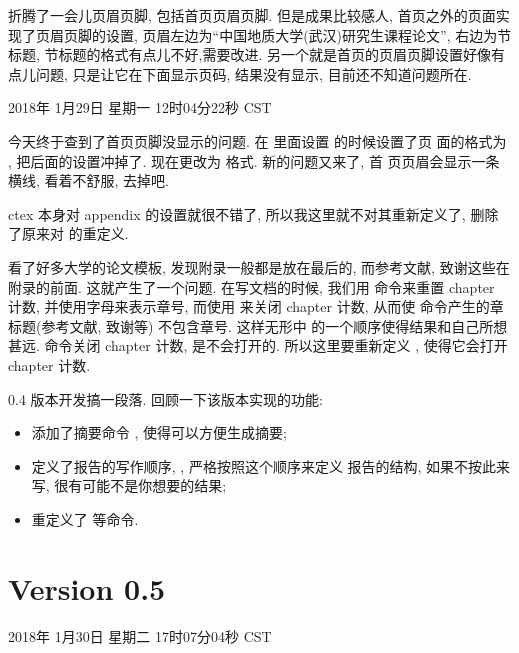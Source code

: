 \documentclass{cugrep}
\begin{document}
折腾了一会儿页眉页脚, 包括首页页眉页脚. 但是成果比较感人, 首页之外的页面实现了页眉页脚的设置,
页眉左边为``中国地质大学(武汉)研究生课程论文'', 右边为节标题, 节标题的格式有点儿不好,需要改进.
另一个就是首页的页眉页脚设置好像有点儿问题, 只是让它在下面显示页码, 结果没有显示, 目前还不知道问题所在. 

2018年 1月29日 星期一 12时04分22秒 CST

今天终于查到了首页页脚没显示的问题. 在  里面设置  的时候设置了页
面的格式为 , 把后面的设置冲掉了. 现在更改为  格式. 新的问题又来了, 首
页页眉会显示一条横线, 看着不舒服, 去掉吧. 

ctex 本身对 appendix 的设置就很不错了, 所以我这里就不对其重新定义了, 删除了原来对 
的重定义. 

看了好多大学的论文模板, 发现附录一般都是放在最后的, 而参考文献, 致谢这些在附录的前面. 这就产生了一个问题.
在写文档的时候, 我们用  命令来重置 chapter 计数, 并使用字母来表示章号, 而使用  
来关闭 chapter 计数, 从而使  命令产生的章标题(参考文献, 致谢等) 不包含章号. 这样无形中
的一个顺序使得结果和自己所想甚远.  命令关闭 chapter 计数,  是不会打开的.
所以这里要重新定义 , 使得它会打开 chapter 计数. 

0.4 版本开发搞一段落. 回顾一下该版本实现的功能:

\begin{itemize}
    \item 添加了摘要命令 , 使得可以方便生成摘要;
    \item 定义了报告的写作顺序, , 严格按照这个顺序来定义
        报告的结构, 如果不按此来写, 很有可能不是你想要的结果;
    \item 重定义了  等命令.
\end{itemize}

\section{Version 0.5}

2018年 1月30日 星期二 17时07分04秒 CST
\end{document}
